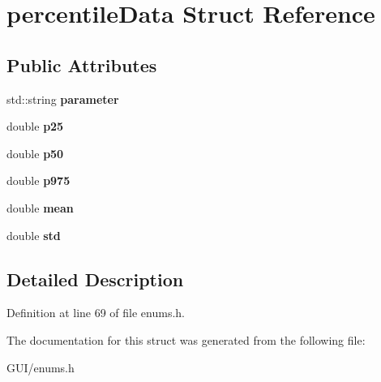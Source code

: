 \hypertarget{structpercentile_data}{}\section{percentile\+Data Struct Reference}
\label{structpercentile_data}
\subsection*{Public Attributes}
\begin{DoxyCompactItemize}
\item 
\mbox{\label{structpercentile_data_ab0cc206a144b2266188a505ad1b3e0b0}} 
std\+::string {\bfseries parameter}
\item 
\mbox{\label{structpercentile_data_a8287358a27d87bac94a1b23ac946e349}} 
double {\bfseries p25}
\item 
\mbox{\label{structpercentile_data_aed772436a57a01d60abb3874aa241b76}} 
double {\bfseries p50}
\item 
\mbox{\label{structpercentile_data_aabbbb8a44e7cd6218e32849ae1cc76b4}} 
double {\bfseries p975}
\item 
\mbox{\label{structpercentile_data_a531d7d7cab16fab4cf56a6cdf3df5448}} 
double {\bfseries mean}
\item 
\mbox{\label{structpercentile_data_aec7717a3e6c6e3cea9acb8af45a1218e}} 
double {\bfseries std}
\end{DoxyCompactItemize}


\subsection{Detailed Description}


Definition at line 69 of file enums.\+h.



The documentation for this struct was generated from the following file\+:\begin{DoxyCompactItemize}
\item 
G\+U\+I/enums.\+h\end{DoxyCompactItemize}
